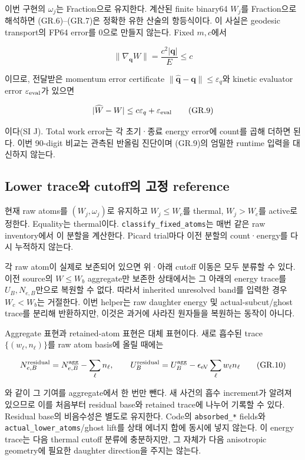이번 구현의 \(\omega_j\)는 Fraction으로 유지한다. 계산된 finite binary64 \(W_j\)를 Fraction으로 해석하면 (GR.6)--(GR.7)은 정확한 유한 산술의 항등식이다. 이 사실은 geodesic transport의 FP64 error를 0으로 만들지 않는다. Fixed \(m,c\)에서

\[
 \|\nabla_{\mathbf q}W\|=\frac{c^2|\mathbf q|}{E}\le c
\tag{GR.8}
\]

이므로, 전달받은 momentum error certificate \(\|\widehat{\mathbf q}-\mathbf q\|\le\varepsilon_q\)와 kinetic evaluator error \(\varepsilon_{\rm eval}\)가 있으면

\[
 |\widehat W-W|\le c\varepsilon_q+\varepsilon_{\rm eval}
\tag{GR.9}
\]

이다(SI J). Total work error는 각 초기·종료 energy error에 count를 곱해 더하면 된다. 이번 90-digit 비교는 관측된 반올림 진단이며 (GR.9)의 엄밀한 runtime 입력을 대신하지 않는다.

\hypertarget{lower-traceuxc640-cutoffuxc758-uxace0uxc815-reference}{%
\subsection{Lower trace와 cutoff의 고정 reference}\label{lower-traceuxc640-cutoffuxc758-uxace0uxc815-reference}}

현재 raw atoms를 \((W_j,\omega_j)\)로 유지하고 \(W_j\le W_c\)를 thermal, \(W_j>W_c\)를 active로 정한다. Equality는 thermal이다. \texttt{classify\_fixed\_atoms}는 매번 같은 raw inventory에서 이 분할을 계산한다. Picard trial마다 이전 분할의 count·energy를 다시 누적하지 않는다.

각 raw atom이 실제로 보존되어 있으면 위·아래 cutoff 이동은 모두 분류할 수 있다. 이전 source의 \(W\le W_b\) aggregate만 보존한 상태에서는 그 아래의 energy trace를 \(U_B,N_{e,B}\)만으로 복원할 수 없다. 따라서 inherited unresolved band를 입력한 경우 \(W_c<W_b\)는 거절한다. 이번 helper는 raw daughter energy 및 actual-subcut/ghost trace를 분리해 반환하지만, 이것은 과거에 사라진 원자들을 복원하는 동작이 아니다.

Aggregate 표현과 retained-atom 표현은 대체 표현이다. 새로 흡수된 trace \(\{(w_\ell,n_\ell)\}\)를 raw atom basis에 올릴 때에는

\[
 N_{e,B}^{\rm residual}=N_{e,B}^{\rm agg}-\sum_\ell n_\ell,\qquad
 U_B^{\rm residual}=U_B^{\rm agg}-\epsilon_{\rm eV}\sum_\ell w_\ell n_\ell
\tag{GR.10}
\]

와 같이 그 기여를 aggregate에서 한 번만 뺀다. 새 사건의 흡수 increment가 알려져 있으므로 이를 처음부터 residual base와 retained trace에 나누어 기록할 수 있다. Residual base의 비음수성은 별도로 유지한다. Code의 \texttt{absorbed\_*} fields와 \texttt{actual\_lower\_atoms}/ghost lift를 상태 에너지 합에 동시에 넣지 않는다. 이 energy trace는 다음 thermal cutoff 분류에 충분하지만, 그 자체가 다음 anisotropic geometry에 필요한 daughter direction을 주지는 않는다.

